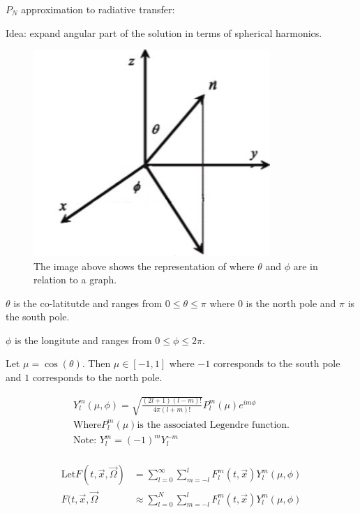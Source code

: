 

$P_N$ approximation to radiative transfer:

Idea: expand angular part of the solution in terms of spherical harmonics.

\begin{figure}[H]
\centering
\includegraphics[width=0.8\textwidth]{spherical_harmonics_graph.jpg}
\caption{The image above shows the representation of where $\theta$ and $\phi$ are in relation to a graph.}
\end{figure}

$\theta$ is the co-latitutde and ranges from $0 \leq \theta \leq \pi$ where $0$ is the north pole and $\pi$ is the south pole. 

$\phi$ is the longitute and ranges from $0 \leq \phi \leq 2\pi$.

Let $\mu = \cos(\theta)$. Then $\mu \in [-1,1]$ where $-1$ corresponds to the south pole and $1$ corresponds to the north pole.

\begin{align*}
Y^m _l (\mu, \phi) = \sqrt{\frac{(2l+1)(l-m)!}{4\pi (l+m)!}} P^m _l (\mu) e^{im\phi} \\
\text{Where} P^m _l (\mu) \text{is the associated Legendre function.} \\
\text{Note: } Y^m _l = (-1)^m Y^{-m} _l \\
\end{align*}

\begin{align*}
\text{Let} F(t, \vec{x}, \vec{\Omega}) &= \sum^{\infty}_{l=0} \sum^{l}_{m=-l}  F^m _l (t, \vec{x}) Y^m _l (\mu, \phi) \\
F(t, \vec{x}, \vec{\Omega} &\approx \sum^{N}_{l=0} \sum^{l}_{m=-l} F^m _l (t, \vec{x}) Y^m _l (\mu, \phi)
\end {align*}

